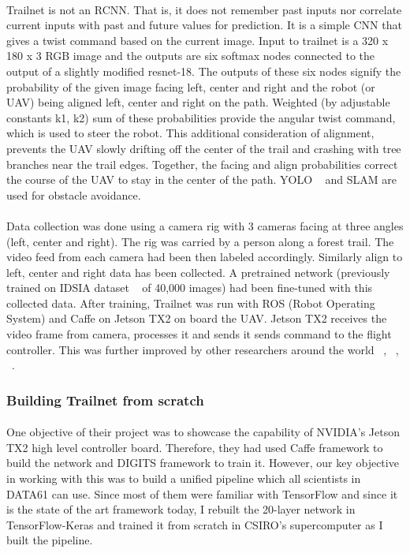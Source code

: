 \paragraph{}
Trailnet is not an RCNN. That is, it does not remember past inputs nor correlate current inputs with past and future values for prediction. It is a simple CNN that gives a twist command based on the current image. Input to trailnet is a 320 x 180 x 3 RGB image and the outputs are six softmax nodes connected to the output of a slightly modified resnet-18. The outputs of these six nodes signify the probability of the given image facing left, center and right and the robot (or UAV) being aligned left, center and right on the path. Weighted (by adjustable constants k1, k2) sum of these probabilities provide the angular twist command, which is used to steer the robot. This additional consideration of alignment, prevents the UAV slowly drifting off the center of the trail and crashing with tree branches near the trail edges. Together, the facing and align probabilities correct the course of the UAV to stay in the center of the path. YOLO ~\cite{yolo} and SLAM are used for obstacle avoidance.

\paragraph{}
Data collection was done using a camera rig with 3 cameras facing at three angles (left, center and right). The rig was carried by a person along a forest trail. The video feed from each camera had been then labeled accordingly. Similarly align to left, center and right data has been collected. A pretrained network (previously trained on IDSIA dataset ~\cite{idsia} of 40,000 images) had been fine-tuned with this collected data. After training, Trailnet was run with ROS (Robot Operating System) and Caffe on Jetson TX2 on board the UAV. Jetson TX2 receives the video frame from camera, processes it and sends it sends command to the flight controller. This was further improved by other researchers around the world ~\cite{trailnet2}, ~\cite{trailnet3}, ~\cite{trailnet4}.



\subsubsection{Building Trailnet from scratch}

\paragraph{}
One objective of their project was to showcase the capability of NVIDIA's Jetson TX2 high level controller board. Therefore, they had used Caffe framework to build the network and DIGITS framework to train it. However, our key objective in working with this was to build a unified pipeline which all scientists in DATA61 can use. Since most of them were familiar with TensorFlow and since it is the state of the art framework today, I rebuilt the 20-layer network in TensorFlow-Keras and trained it from scratch in CSIRO's supercomputer as I built the pipeline.

